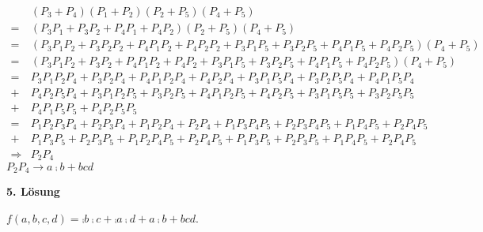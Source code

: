 \documentclass{CInf_practice}
\begin{document}
\begin{align*}
 &(P_3+P_4)(P_1+P_2)(P_2+P_5)(P_4+P_5) \\
=&(P_3P_1+P_3P_2+P_4P_1+P_4P_2)(P_2+P_5)(P_4+P_5) \\
=&(P_3P_1P_2+P_3P_2P_2+P_4P_1P_2+P_4P_2P_2+P_3P_1P_5+P_3P_2P_5+P_4P_1P_5+P_4P_2P_5)(P_4+P_5) \\
=&(P_3P_1P_2+P_3P_2+P_4P_1P_2+P_4P_2+P_3P_1P_5+P_3P_2P_5+P_4P_1P_5+P_4P_2P_5)(P_4+P_5) \\
=&P_3P_1P_2P_4+P_3P_2P_4+P_4P_1P_2P_4+P_4P_2P_4+P_3P_1P_5P_4+P_3P_2P_5P_4+P_4P_1P_5P_4\\
+&P_4P_2P_5P_4+P_3P_1P_2P_5+P_3P_2P_5+P_4P_1P_2P_5+P_4P_2P_5+P_3P_1P_5P_5+P_3P_2P_5P_5\\
+&P_4P_1P_5P_5+P_4P_2P_5P_5 \\
=&P_1P_2P_3P_4+P_2P_3P_4+P_1P_2P_4+P_2P_4+P_1P_3P_4P_5+P_2P_3P_4P_5+P_1P_4P_5+P_2P_4P_5 \\
+&P_1P_3P_5+P_2P_3P_5+P_1P_2P_4P_5+P_2P_4P_5+P_1P_3P_5+P_2P_3P_5+P_1P_4P_5+P_2P_4P_5 \\
\Rightarrow&P_2P_4
\end{align*}
$P_2P_4\rightarrow a\comp b + bcd$

\bigskip

\textbf{5. Lösung}

$f(a,b,c,d)=\comp b \comp c + \comp a \comp d + a \comp b + bcd$.




\end{document}
